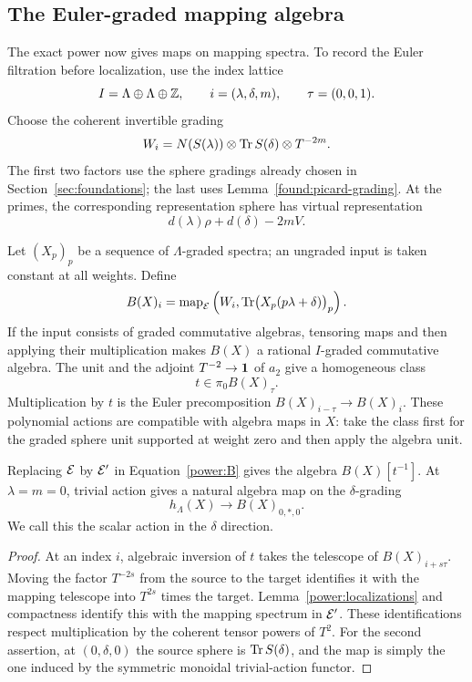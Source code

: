 \subsection{The Euler-graded mapping algebra}

The exact power now gives maps on mapping spectra. To record the Euler
filtration before localization, use the index lattice
\[
 I=\Lambda\oplus\Lambda\oplus\mathbb Z,
 \qquad i=(\lambda,\delta,m),\qquad \tau=(0,0,1).
\]
Choose the coherent invertible grading
\begin{equation}
 \label{power:W}
 W_i=N(S(\lambda))\otimes\operatorname{Tr} S(\delta)\otimes T^{-2m}.
\end{equation}
The first two factors use the sphere gradings already chosen in
Section~\ref{sec:foundations}; the last uses
Lemma~\ref{found:picard-grading}. At the primes, the corresponding
representation sphere has virtual representation
\[
 d(\lambda)\rho+d(\delta)-2mV.
\]

Let $(X_p)_p$ be a sequence of $\Lambda$-graded spectra; an ungraded
input is taken constant at all weights. Define
\begin{equation}
 \label{power:B}
 B(X)_i=\operatorname{map}_{\mathcal E}
 \left(W_i,\operatorname{Tr}\bigl(X_p(p\lambda+\delta)\bigr)_p\right).
\end{equation}
If the input consists of graded commutative algebras, tensoring maps
and then applying their multiplication makes $B(X)$ a rational
$I$-graded commutative algebra. The unit and the adjoint
$T^{-2}\to\mathbf 1$ of $a_2$ give a homogeneous class
\[
 t\in\pi_0B(X)_\tau.
\]
Multiplication by $t$ is the Euler precomposition
$B(X)_{i-\tau}\to B(X)_i$. These polynomial actions are compatible
with algebra maps in $X$: take the class first for the graded sphere
unit supported at weight zero and then apply the algebra unit.

\begin{lemma}
\label{power:graded-localization}
Replacing $\mathcal E$ by $\mathcal E'$ in Equation~\eqref{power:B} gives the
algebra $B(X)[t^{-1}]$. At $\lambda=m=0$, trivial action gives a
natural algebra map on the $\delta$-grading
\[
 h_\Lambda(X)\longrightarrow B(X)_{0,*,0}.
\]
We call this the scalar action in the $\delta$ direction.
\end{lemma}

\begin{proof}
At an index $i$, algebraic inversion of $t$ takes the telescope of
$B(X)_{i+s\tau}$. Moving the factor $T^{-2s}$ from the source to the
target identifies it with the mapping telescope into $T^{2s}$ times
the target. Lemma~\ref{power:localizations} and compactness identify
this with the mapping spectrum in $\mathcal E'$. These identifications
respect multiplication by the coherent tensor powers of $T^2$.
For the second assertion, at $(0,\delta,0)$ the source sphere is
$\operatorname{Tr} S(\delta)$, and the map is simply the one induced by the
symmetric monoidal trivial-action functor.
\end{proof}


